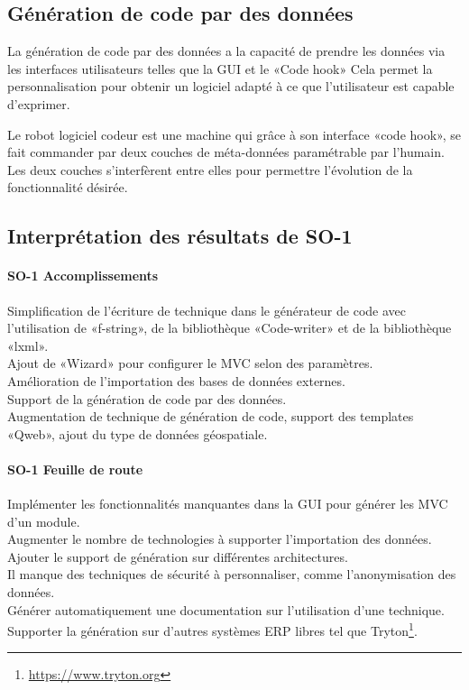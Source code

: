 \subsection{Génération de code par des données}

La génération de code par des données a la capacité de prendre les données via les interfaces utilisateurs telles que la GUI et le «Code hook» Cela permet la personnalisation pour obtenir un logiciel adapté à ce que l’utilisateur est capable d’exprimer.

Le robot logiciel codeur est une machine qui grâce à son interface «code hook», se fait commander par deux couches de méta-données paramétrable par l’humain. Les deux couches s’interfèrent entre elles pour permettre l’évolution de la fonctionnalité désirée.


\subsection{Interprétation des résultats de SO-1}

\paragraph{SO-1 Accomplissements}
Simplification de l’écriture de technique dans le générateur de code avec l’utilisation de «f-string», de la bibliothèque «Code-writer» et de la bibliothèque «lxml».\\
Ajout de «Wizard» pour configurer le MVC selon des paramètres.\\
Amélioration de l’importation des bases de données externes.\\
Support de la génération de code par des données.\\
Augmentation de technique de génération de code, support des templates «Qweb», ajout du type de données géospatiale.

\paragraph{SO-1 Feuille de route}
Implémenter les fonctionnalités manquantes dans la GUI pour générer les MVC d’un module.\\
Augmenter le nombre de technologies à supporter l'importation des données.\\
Ajouter le support de génération sur différentes architectures.\\
Il manque des techniques de sécurité à personnaliser, comme l’anonymisation des données.\\
Générer automatiquement une documentation sur l’utilisation d’une technique. \\
Supporter la génération sur d’autres systèmes ERP libres tel que Tryton\footnote{\url{https://www.tryton.org}}.

